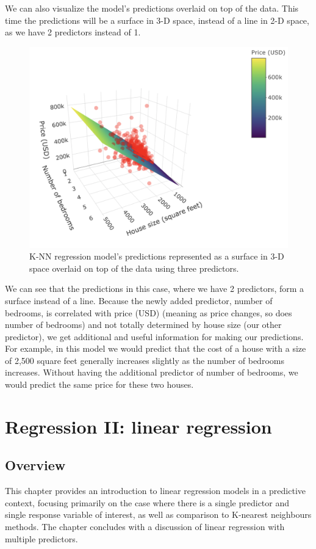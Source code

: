 \documentclass[
]{krantz}
\begin{document}
We can also visualize the model's predictions overlaid on top of the data. This time the predictions
will be a surface in 3-D space, instead of a line in 2-D space, as we have 2
predictors instead of 1.

\begin{figure}
\includegraphics[width=0.7\linewidth]{img/lm-regr_3d} \caption{K-NN regression model’s predictions represented as a surface in 3-D space overlaid on top of the data using three predictors.}\label{fig:07-knn-mult-viz}
\end{figure}

We can see that the predictions in this case, where we have 2 predictors, form
a surface instead of a line. Because the newly added predictor, number of
bedrooms, is correlated with price (USD) (meaning as price changes, so does
number of bedrooms) and not totally determined by house size (our other predictor),
we get additional and useful information for making our
predictions. For example, in this model we would predict that the cost of a
house with a size of 2,500 square feet generally increases slightly as the number
of bedrooms increases. Without having the additional predictor of number of
bedrooms, we would predict the same price for these two houses.

\hypertarget{regression2}{%
\chapter{Regression II: linear regression}\label{regression2}}

\hypertarget{overview-7}{%
\section{Overview}\label{overview-7}}

This chapter provides an introduction to linear regression models
in a predictive context, focusing primarily on the case where
there is a single predictor and single response variable of interest,
as well as comparison to K-nearest neighbours methods. The
chapter concludes with a discussion of linear regression with
multiple predictors.
\end{document}
